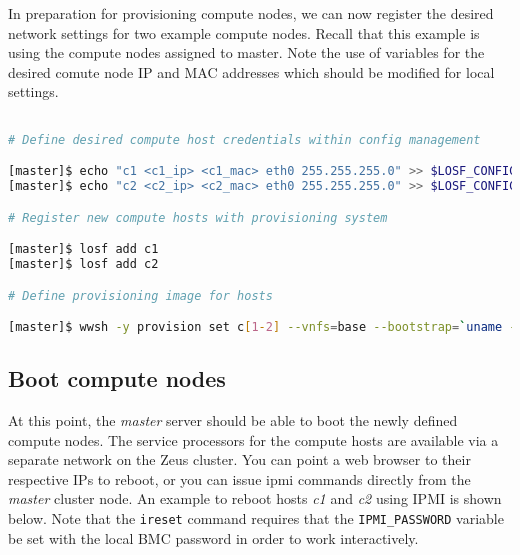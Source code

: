 \documentclass[letterpaper]{article}
\begin{document}

In preparation for provisioning compute nodes, we can now register the desired
network settings for two example compute nodes. Recall that this example is
using the compute nodes assigned to master. Note the use of variables for the
desired comute node IP and MAC addresses which should be modified for local
settings. 

\vspace*{0.2cm}

\begin{lstlisting}[language=bash,keywords={},upquote=true,basicstyle=\footnotesize\ttfamily]

# Define desired compute host credentials within config management

[master]$ echo "c1 <c1_ip> <c1_mac> eth0 255.255.255.0" >> $LOSF_CONFIG_DIR/ips.cluster
[master]$ echo "c2 <c2_ip> <c2_mac> eth0 255.255.255.0" >> $LOSF_CONFIG_DIR/ips.cluster

# Register new compute hosts with provisioning system

[master]$ losf add c1
[master]$ losf add c2

# Define provisioning image for hosts

[master]$ wwsh -y provision set c[1-2] --vnfs=base --bootstrap=`uname -r`

\end{lstlisting}



\subsection{Boot compute nodes}

At this point, the {\em master} server should be able to boot the newly defined
compute nodes.  The service processors for the compute hosts are available via
a separate network on the Zeus cluster. You can point a web browser to their
respective IPs to reboot, or you can issue ipmi commands directly from the {\em
  master} cluster node.  An example to reboot hosts {\em c1} and {\em c2} using
IPMI is shown below.  Note that the \texttt{ireset} command requires that the
\texttt{IPMI\_PASSWORD} variable be set with the local BMC password in order to
work interactively.

\vspace*{0.2cm}

\end{document}
